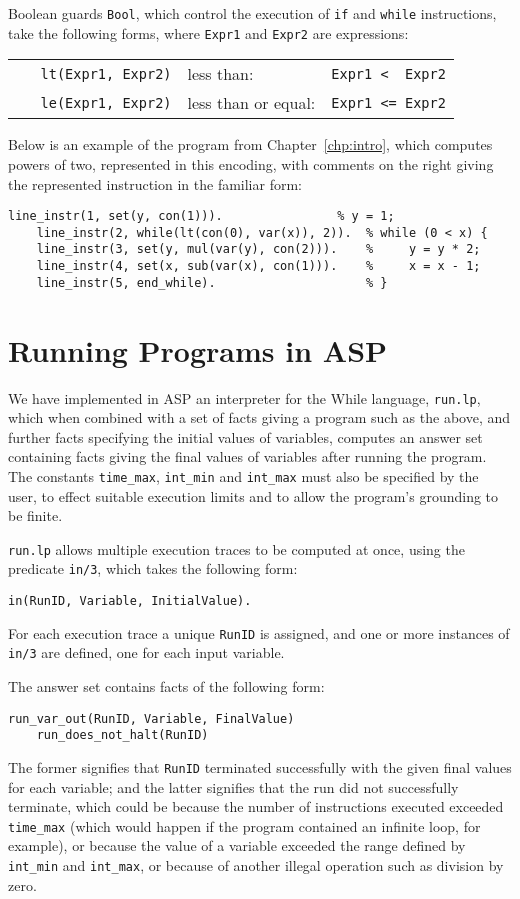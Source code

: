 \documentclass[a4paper,twoside,notitlepage]{report}
\begin{document}
Boolean guards \verb|Bool|, which control the execution of \verb|if| and 
\verb|while| instructions, take the following forms, where \verb|Expr1| 
and \verb|Expr2| are expressions:

\begin{tabular}{lll}
    \verb|   lt(Expr1, Expr2)| & less than:          & \verb|Expr1 <  Expr2|
\\  \verb|   le(Expr1, Expr2)| & less than or equal: & \verb|Expr1 <= Expr2|
\end{tabular}

Below is an example of the program from Chapter~\ref{chp:intro}, which 
computes powers of two, represented in this encoding, with comments on 
the right giving the represented instruction in the familiar form:
\begin{Verbatim}[samepage=true]
    line_instr(1, set(y, con(1))).                % y = 1;
    line_instr(2, while(lt(con(0), var(x)), 2)).  % while (0 < x) {
    line_instr(3, set(y, mul(var(y), con(2))).    %     y = y * 2;
    line_instr(4, set(x, sub(var(x), con(1))).    %     x = x - 1;
    line_instr(5, end_while).                     % }
\end{Verbatim}

\section{Running Programs in ASP} \label{sec:runasp}

We have implemented in ASP an interpreter for the While language, 
\verb|run.lp|, which when combined with a set of facts giving a program 
such as the above, and further facts specifying the initial values of 
variables, computes an answer set containing facts giving the final values 
of variables after running the program. The constants \verb|time_max|, 
\verb|int_min| and \verb|int_max| must also be specified by the user, to 
effect suitable execution limits and to allow the program's grounding to 
be finite.

\verb|run.lp| allows multiple execution traces to be computed at once, 
using the predicate \verb|in/3|, which takes the following form:
\begin{Verbatim}[samepage=true]
    in(RunID, Variable, InitialValue).
\end{Verbatim}
For each execution trace a unique \verb|RunID| is assigned, and one or 
more instances of \verb|in/3| are defined, one for each input variable.

The answer set contains facts of the following form:
\begin{Verbatim}[samepage=true]
    run_var_out(RunID, Variable, FinalValue)
    run_does_not_halt(RunID)
\end{Verbatim}
The former signifies that \verb|RunID| terminated successfully with the 
given final values for each variable; and the latter signifies that the 
run did not successfully terminate, which could be because the number of 
instructions executed exceeded \verb|time_max| (which would happen if the 
program contained an infinite loop, for example), or because the value of 
a variable exceeded the range defined by \verb|int_min| and 
\verb|int_max|, or because of another illegal operation such as division 
by zero.
\end{document}

